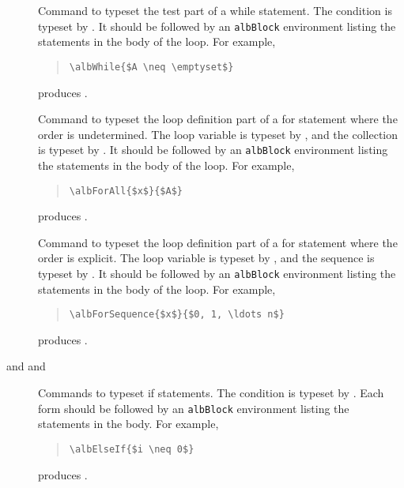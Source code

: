 \documentclass[11pt,a4paper,oneside,titlepage]{alb-corp}
\begin{document}
\begin{description}
\item[] Command to typeset the test
  part of a while statement.  The condition is typeset by
  .  It should be followed by an \texttt{albBlock}
  environment listing the statements in the body of the loop.  For
  example,
  \begin{quote}
\begin{verbatim}
\albWhile{$A \neq \emptyset$}
\end{verbatim}
  \end{quote}
  produces .

\item[] Command to
  typeset the loop definition part of a for statement where the order is
  undetermined.  The loop variable is typeset by , and
  the collection is typeset by .  It should be followed
  by an \texttt{albBlock} environment listing the statements in the body
  of the loop.  For example,
  \begin{quote}
\begin{verbatim}
\albForAll{$x$}{$A$}
\end{verbatim}
  \end{quote}
  produces .

\item[] Command
  to typeset the loop definition part of a for statement where the order
  is explicit.  The loop variable is typeset by , and the
  sequence is typeset by .  It should be followed by an
  \texttt{albBlock} environment listing the statements in the body of
  the loop.  For example,
  \begin{quote}
\begin{verbatim}
\albForSequence{$x$}{$0, 1, \ldots n$}
\end{verbatim}
  \end{quote}
  produces .

\item[%
   and
   and %
  ] Commands to typeset if statements.  The condition is typeset by
  .  Each form should be followed by an
  \texttt{albBlock} environment listing the statements in the body.  For
  example,
  \begin{quote}
\begin{verbatim}
\albElseIf{$i \neq 0$}
\end{verbatim}
  \end{quote}
  produces .
\end{description}
\end{document}
